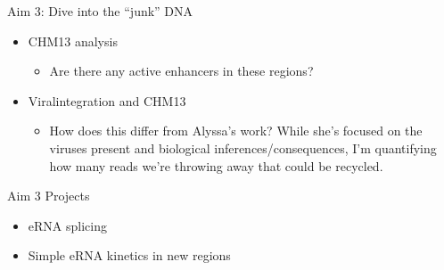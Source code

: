 \documentclass[bigger]{beamer}
\begin{document}
\begin{frame}[label={sec:orgdc955f0}]{Aim 3: Dive into the ``junk'' DNA}
\begin{itemize}
\item CHM13 analysis
\begin{itemize}
\item Are there any active enhancers in these regions?
\end{itemize}
\item Viralintegration and CHM13
\begin{itemize}
\item How does this differ from Alyssa's work? While she's focused on the
viruses present and biological inferences/consequences, I'm quantifying
how many reads we're throwing away that could be recycled.
\end{itemize}
\end{itemize}
\end{frame}


\begin{frame}[label={sec:org0100214}]{Aim 3 Projects}
\begin{itemize}
\item eRNA splicing
\item Simple eRNA kinetics in new regions
\end{itemize}
\end{frame}
\end{document}
